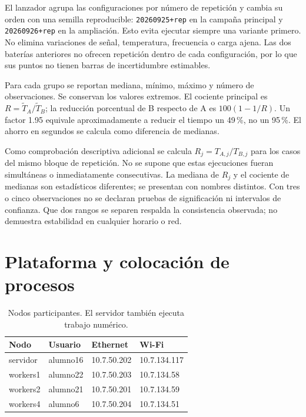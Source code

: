 El lanzador agrupa las configuraciones por número de repetición y cambia su orden con una semilla reproducible: \texttt{20260925+rep} en la campaña principal y \texttt{20260926+rep} en la ampliación. Esto evita ejecutar siempre una variante primero. No elimina variaciones de señal, temperatura, frecuencia o carga ajena. Las dos baterías anteriores no ofrecen repetición dentro de cada configuración, por lo que sus puntos no tienen barras de incertidumbre estimables.

Para cada grupo se reportan mediana, mínimo, máximo y número de observaciones. Se conservan los valores extremos. El cociente principal es $R=\widetilde T_A/\widetilde T_B$; la reducción porcentual de B respecto de A es $100(1-1/R)$. Un factor 1.95 equivale aproximadamente a reducir el tiempo un 49\,\%, no un 95\,\%. El ahorro en segundos se calcula como diferencia de medianas.

Como comprobación descriptiva adicional se calcula $R_j=T_{A,j}/T_{B,j}$ para los casos del mismo bloque de repetición. No se supone que estas ejecuciones fueran simultáneas o inmediatamente consecutivas. La mediana de $R_j$ y el cociente de medianas son estadísticos diferentes; se presentan con nombres distintos. Con tres o cinco observaciones no se declaran pruebas de significación ni intervalos de confianza. Que dos rangos se separen respalda la consistencia observada; no demuestra estabilidad en cualquier horario o red.

\section{Plataforma y colocación de procesos}\label{sec:plataforma}

\begin{table}[H]\centering\small
\caption{Nodos participantes. El servidor también ejecuta trabajo numérico.}
\begin{tabular}{llll}
\toprule Nodo & Usuario & Ethernet & Wi-Fi \\
\midrule
servidor & alumno16 & 10.7.50.202 & 10.7.134.117 \\
workers1 & alumno22 & 10.7.50.203 & 10.7.134.58 \\
workers2 & alumno21 & 10.7.50.201 & 10.7.134.59 \\
workers4 & alumno6 & 10.7.50.204 & 10.7.134.51 \\
\bottomrule
\end{tabular}
\end{table}

